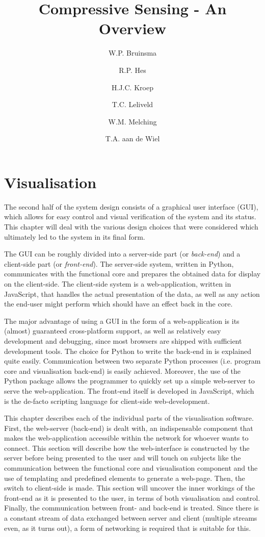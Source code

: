 \documentclass[a4paper, openany, oneside]{memoir}
\title{Compressive Sensing - An Overview}
\author{W.P. Bruinsma \and R.P. Hes \and H.J.C. Kroep \and T.C. Leliveld \and W.M. Melching \and T.A. aan de Wiel}
\begin{document}
\chapter{Visualisation}
The second half of the system design consists of a graphical user interface (GUI), which allows for easy control and visual verification of the system and its status. This chapter will deal with the various design choices that were considered which ultimately led to the system in its final form.

The GUI can be roughly divided into a server-side part (or \emph{back-end}) and a client-side part (or \emph{front-end}). The server-side system, written in Python, communicates with the functional core and prepares the obtained data for display on the client-side. The client-side system is a web-application, written in JavaScript, that handles the actual presentation of the data, as well as any action the end-user might perform which should have an effect back in the core.

The major advantage of using a GUI in the form of a web-application is its (almost) guaranteed cross-platform support, as well as relatively easy development and debugging, since most browsers are shipped with sufficient development tools.
The choice for Python to write the back-end in is explained quite easily. Communication between two separate Python processes (i.e. program core and visualisation back-end) is easily achieved. Moreover, the use of the  Python package allows the programmer to quickly set up a simple web-server to serve the web-application.
The front-end itself is developed in JavaScript, which is the de-facto scripting language for client-side web-development.

This chapter describes each of the individual parts of the visualisation software.
First, the web-server (back-end) is dealt with, an indispensable component that makes the web-application accessible within the network for whoever wants to connect. This section will describe how the web-interface is constructed by the server before being presented to the user and will touch on subjects like the communication between the functional core and visualisation component and the use of templating and predefined elements to generate a web-page.
Then, the switch to client-side is made. This section will uncover the inner workings of the front-end as it is presented to the user, in terms of both visualisation and control.
Finally, the communication between front- and back-end is treated. Since there is a constant stream of data exchanged between server and client (multiple streams even, as it turns out), a form of networking is required that is suitable for this.
\end{document}
